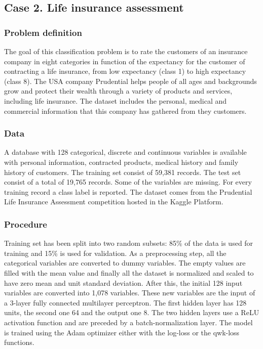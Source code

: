 \documentclass[times,twocolumn,final,authoryear]{elsarticle}
\begin{document}
\subsection{Case 2. Life insurance assessment}

\subsubsection{Problem definition}

The goal of this classification problem is to rate the customers of an insurance company in eight categories in function of the expectancy for the customer of contracting a life insurance, from low expectancy (class 1) to high expectancy (class 8). The USA company Prudential helps people of all ages and backgrounds grow and protect their wealth through a variety of products and services, including life insurance. The dataset includes the personal, medical and commercial information that this company has gathered from they customers. 

\subsubsection{Data}

A database with 128 categorical, discrete and continuous variables is available with personal information, contracted products, medical history and family history of customers. The training set consist of 59,381 records. The test set consist of a total of 19,765 records. Some of the variables are missing. For every training record a class label is reported. The dataset comes from the Prudential Life Insurance Assessment competition hosted in the Kaggle Platform.

\subsubsection{Procedure}

Training set has been split into two random subsets: 85\% of the data is used for training and 15\% is used for validation. As a preprocessing step, all the categorical variables are converted to dummy variables. The empty values are filled with the mean value and finally all the dataset is normalized and scaled to have zero mean and unit standard deviation. After this, the initial 128 input variables are converted into 1,078 variables. These new variables are the input of a 3-layer fully connected multilayer perceptron. The first hidden layer has 128 units, the second one 64 and the output one 8. The two hidden layers use a ReLU activation function and are preceded by a batch-normalization layer. The model is trained using the Adam optimizer either with the log-loss or the qwk-loss functions.
\end{document}
